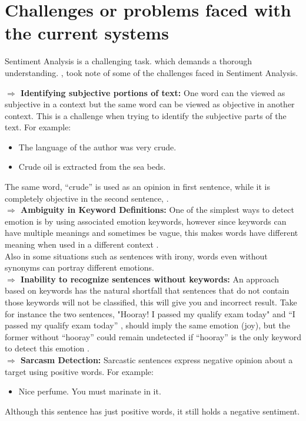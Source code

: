 \section{Challenges or problems faced with the current systems}
Sentiment Analysis is a challenging task. which demands a thorough understanding.
\cite{ref39}, took note of some of the challenges faced in Sentiment Analysis.

\textbf{$\Rightarrow$ Identifying subjective portions of text:} One word can the viewed as subjective in a context but the same word can be viewed as objective in another context. This is a challenge when trying to identify the subjective parts of the text. For example:
\begin{itemize}
\item The language of the author was very crude.
\item Crude oil is extracted from the sea beds.
\end{itemize}

The same word, “crude” is used as an opinion in first sentence, while it is completely
objective in the second sentence, \cite{ref20}.\\
\textbf{$\Rightarrow$ Ambiguity in Keyword Definitions:} One of the simplest ways to detect emotion is by using associated emotion keywords, however since keywords can have multiple meanings and sometimes be vague, this makes words have different meaning when used in a  different context \cite{ref39}.\\
Also in some situations such as sentences with irony, words even without synonyms can portray different emotions.\\
\textbf{$\Rightarrow$ Inability to recognize sentences without keywords:} 
An approach based on keywords has the natural shortfall that sentences that do not contain those keywords will not be classified, this will give you and incorrect result.
Take for instance the two sentences, "Hooray! I passed my qualify exam today"  and  “I passed my qualify exam today” , should imply the same emotion (joy), but the former without “hooray” could
remain undetected if “hooray” is the only keyword to detect this emotion \cite{ref39}.\\


\textbf{$\Rightarrow$ Sarcasm Detection:} Sarcastic sentences express negative opinion about a target using
positive words. For example:\\
\begin{itemize}
\item Nice perfume. You must marinate in it.
\end{itemize}
Although this sentence has just positive words, it still holds a negative sentiment.\\


